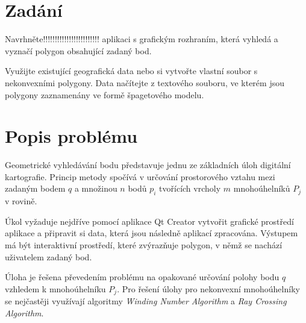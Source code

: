 \documentclass[11pt]{article}
\begin{document}



\tableofcontents

\clearpage


\section{Zadání}
Navrhněte!!!!!!!!!!!!!!!!!!!!!!!! aplikaci s grafickým rozhraním, která vyhledá a vyznačí polygon obsahující zadaný bod.

Využijte existující geografická data nebo si vytvořte vlastní soubor s nekonvexními polygony. Data načítejte z textového souboru, ve kterém jsou polygony zaznamenány ve formě špagetového modelu. 


\section{Popis problému}
Geometrické vyhledávání bodu představuje jednu ze základních úloh digitální kartografie. 
Princip metody spočívá v určování prostorového vztahu mezi zadaným bodem $q$ a množinou $n$ bodů ${p_{i}}$ tvořících vrcholy $m$ mnohoúhelníků ${P_{j}}$ v rovině.

Úkol vyžaduje nejdříve pomocí aplikace Qt Creator vytvořit grafické prostředí aplikace a připravit si data, která jsou následně aplikací zpracována. Výstupem má být interaktivní prostředí, které zvýrazňuje polygon, v němž se nachází uživatelem zadaný bod. 


Úloha je řešena převedením problému na opakované určování polohy bodu $q$ vzhledem k mnohoúhelníku ${P_{j}}$. Pro řešení úlohy pro nekonvexní mnohoúhelníky se nejčastěji využívají algoritmy \textit {Winding Number Algorithm} a \textit{Ray Crossing Algorithm}.
\end{document}
